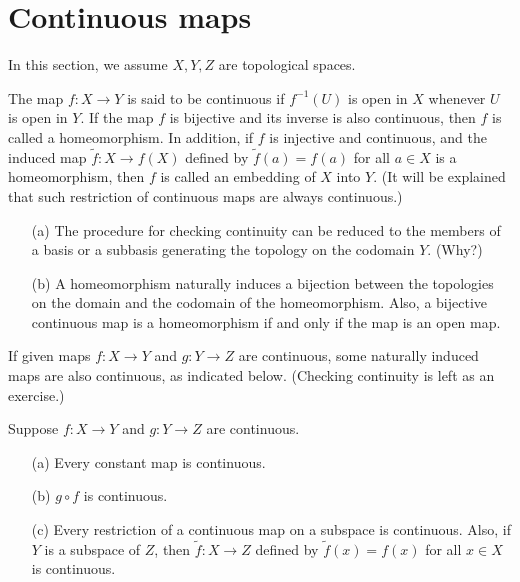 \section{Continuous maps}

In this section, we assume $X, Y, Z$ are topological spaces.

\begin{defi}[Continuity]
    The map $f: X\rightarrow Y$ is said to be continuous if $f^{-1}(U)$ is open in $X$ whenever $U$ is open in $Y$.
    If the map $f$ is bijective and its inverse is also continuous, then $f$ is called a homeomorphism.
    In addition, if $f$ is injective and continuous, and the induced map $\tilde{f}: X\rightarrow f(X)$ defined by $\tilde{f}(a)=f(a)$ for all $a\in X$ is a homeomorphism, then $f$ is called an embedding of $X$ into $Y$.
    (It will be explained that such restriction of continuous maps are always continuous.)
\end{defi}

\begin{rmk}
    \begin{enumerate}
        \item[(a)]
        {
            The procedure for checking continuity can be reduced to the members of a basis or a subbasis generating the topology on the codomain $Y$. \color{brown}(Why?)\color{black}
        }
        \item[(b)]
        {
            A homeomorphism naturally induces a bijection between the topologies on the domain and the codomain of the homeomorphism. Also, a bijective continuous map is a homeomorphism if and only if the map is an open map.
        }
    \end{enumerate}
\end{rmk}

If given maps $f: X\rightarrow Y$ and $g: Y\rightarrow Z$ are continuous, some naturally induced maps are also continuous, as indicated below. \color{brown}(Checking continuity is left as an exercise.)\color{black}

\begin{prop}
    Suppose $f: X\rightarrow Y$ and $g: Y\rightarrow Z$ are continuous.
    \begin{enumerate}
        \item[(a)] Every constant map is continuous.
        \item[(b)] $g\circ f$ is continuous.
        \item[(c)] Every restriction of a continuous map on a subspace is continuous. Also, if $Y$ is a subspace of $Z$, then $\tilde{f}: X\rightarrow Z$ defined by $\tilde{f}(x)=f(x)$ for all $x\in X$ is continuous.
    \end{enumerate}
\end{prop}

